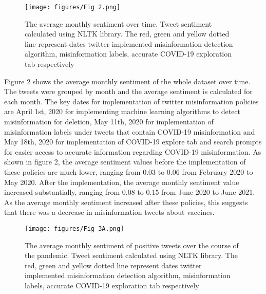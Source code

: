 \documentclass[10pt,twocolumn,letterpaper]{article}
\begin{document}
\begin{figure}[H]
  \centering
  \texttt{[image: figures/Fig 2.png]}
  \caption{The average monthly sentiment over time. Tweet sentiment calculated using NLTK library. The red, green and yellow dotted line represent dates twitter implemented misinformation detection algorithm, misinformation labels, accurate COVID-19 exploration tab respectively}
\end{figure}

Figure 2 shows the average monthly sentiment of the whole dataset over time. The tweets were grouped by month and the average sentiment is calculated for each month. The key dates for implementation of twitter misinformation policies are April 1st, 2020 for implementing machine learning algorithms to detect misinformation for deletion, May 11th, 2020 for implementation of misinformation labels under tweets that contain COVID-19 misinformation and May 18th, 2020 for implementation of COVID-19 explore tab and search prompts for easier access to accurate information regarding COVID-19 misinformation. As shown in figure 2, the average sentiment values before the implementation of these policies are much lower, ranging from 0.03 to 0.06 from February 2020 to May 2020. After the implementation, the average monthly sentiment value increased substantially, ranging from 0.08 to 0.15 from June 2020 to June 2021. As the average monthly sentiment increased after these policies, this suggests that there was a decrease in misinformation tweets about vaccines.



\begin{figure}
  \centering
  \texttt{[image: figures/Fig 3A.png]}
  \caption{The average monthly sentiment of positive tweets over the course of the pandemic. Tweet sentiment calculated using NLTK library. The red, green and yellow dotted line represent dates twitter implemented misinformation detection algorithm, misinformation labels, accurate COVID-19 exploration tab respectively }
\end{figure}
\end{document}
